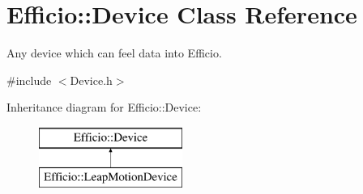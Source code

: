 \hypertarget{class_efficio_1_1_device}{}\section{Efficio\+:\+:Device Class Reference}
\label{class_efficio_1_1_device}


Any device which can feel data into Efficio.  




{\ttfamily \#include $<$Device.\+h$>$}

Inheritance diagram for Efficio\+:\+:Device\+:\begin{figure}[H]
\begin{center}
\leavevmode
\includegraphics[height=2.000000cm]{class_efficio_1_1_device}
\end{center}
\end{figure}
